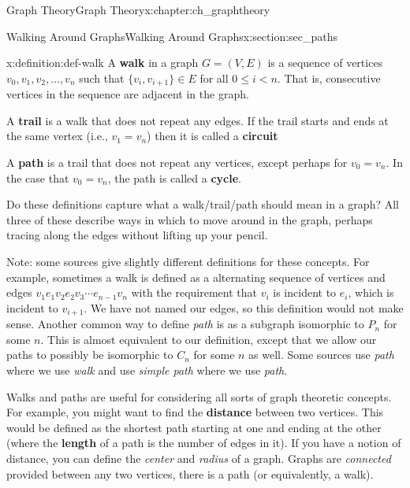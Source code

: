 \documentclass[oneside,10pt,]{book}
\newcommand{\terminology}[1]{\textbf{#1}}
\numberwithin{equation}{chapter}
\newcommand{\lt}{<}
\begin{document}
\begin{chapterptx}{Graph Theory}{}{Graph Theory}{}{}{x:chapter:ch_graphtheory}
\begin{sectionptx}{Walking Around Graphs}{}{Walking Around Graphs}{}{}{x:section:sec_paths}
\begin{introduction}{}
\begin{definition}{}{x:definition:def-walk}%
%
%
%
%
%
A \terminology{walk} in a graph \(G = (V,E)\) is a sequence of vertices \(v_0, v_1, v_2, \ldots, v_n\) such that \(\{v_i, v_{i+1}\} \in E\) for all \(0 \le i \lt n\).  That is, consecutive vertices in the sequence are adjacent in the graph.%
\par
A \terminology{trail} is a walk that does not repeat any edges.  If the trail starts and ends at the same vertex (i.e., \(v_1 = v_n\)) then it is called a \terminology{circuit}%
\par
A \terminology{path} is a trail that does not repeat any vertices, except perhaps for \(v_0 = v_n\).  In the case that \(v_0 = v_n\), the path is called a \terminology{cycle}.%
\end{definition}
Do these definitions capture what a walk\slash{}trail\slash{}path should mean in a graph?  All three of these describe ways in which to move around in the graph, perhaps tracing along the edges without lifting up your pencil.%
\par
Note: some sources give slightly different definitions for these concepts.  For example, sometimes a walk is defined as a alternating sequence of vertices and edges \(v_1e_1v_2e_2v_3\cdots e_{n-1}v_n\) with the requirement that \(v_i\) is incident to \(e_i\), which is incident to \(v_{i+1}\).  We have not named our edges, so this definition would not make sense.  Another common way to define \emph{path} is as a subgraph isomorphic to \(P_n\) for some \(n\).  This is almost equivalent to our definition, except that we allow our paths to possibly be isomorphic to \(C_n\) for some \(n\) as well.  Some sources use \emph{path} where we use \emph{walk} and use \emph{simple path} where we use \emph{path}.%
\par
Walks and paths are useful for considering all sorts of graph theoretic concepts.  For example, you might want to find the \terminology{distance} between two vertices.  This would be defined as the shortest path starting at one and ending at the other (where the \terminology{length} of a path is the number of edges in it).  If you have a notion of distance, you can define the \emph{center} and \emph{radius} of a graph.  Graphs are \emph{connected} provided between any two vertices, there is a path (or equivalently, a walk).%
\end{introduction}%
%
%
\typeout{************************************************}

\end{sectionptx}
\end{chapterptx}
\end{document}
